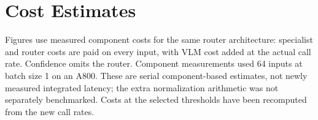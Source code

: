 \documentclass[10pt]{article}
\begin{document}
\section{Cost Estimates}
Figures use measured component costs for the same router architecture: specialist and router costs are paid on every input, with VLM cost added at the actual call rate. Confidence omits the router. Component measurements used 64 inputs at batch size 1 on an A800. These are serial component-based estimates, not newly measured integrated latency; the extra normalization arithmetic was not separately benchmarked. Costs at the selected thresholds have been recomputed from the new call rates.



\end{document}
